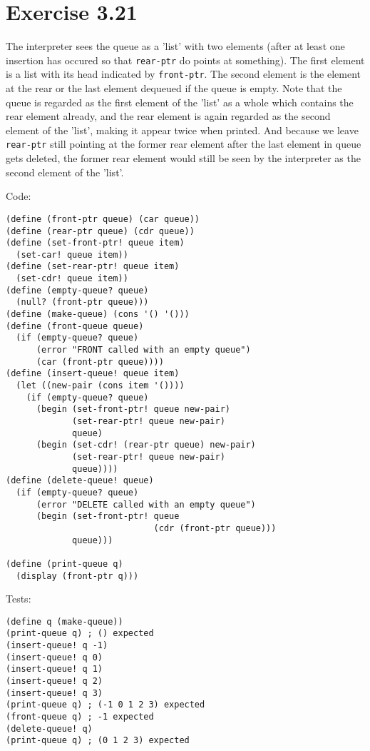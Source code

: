 \documentclass[../main.tex]{subfiles}
\begin{document}
\section{Exercise 3.21}

The interpreter sees the queue as a 'list'
 with two elements (after at least one insertion
 has occured so that \lstinline{rear-ptr} do
 points at something). The first element is a
 list with its head indicated by
 \lstinline{front-ptr}. The second element
 is the element at the rear or the last element
 dequeued if the queue is empty.
 Note that the queue is regarded as the first element
 of the 'list' as a whole which contains the rear
 element already, and the rear element is again
 regarded as the second element of the 'list',
 making it appear twice when printed. And because
 we leave \lstinline{rear-ptr} still
 pointing at the former rear element after the
 last element in queue gets deleted, the former
 rear element would still be seen by the
 interpreter as the second element of the 'list'.

Code:

\begin{lstlisting}
(define (front-ptr queue) (car queue))
(define (rear-ptr queue) (cdr queue))
(define (set-front-ptr! queue item)
  (set-car! queue item))
(define (set-rear-ptr! queue item)
  (set-cdr! queue item))
(define (empty-queue? queue)
  (null? (front-ptr queue)))
(define (make-queue) (cons '() '()))
(define (front-queue queue)
  (if (empty-queue? queue)
      (error "FRONT called with an empty queue")
      (car (front-ptr queue))))
(define (insert-queue! queue item)
  (let ((new-pair (cons item '())))
    (if (empty-queue? queue)
      (begin (set-front-ptr! queue new-pair)
             (set-rear-ptr! queue new-pair)
             queue)
      (begin (set-cdr! (rear-ptr queue) new-pair)
             (set-rear-ptr! queue new-pair)
             queue))))
(define (delete-queue! queue)
  (if (empty-queue? queue)
      (error "DELETE called with an empty queue")
      (begin (set-front-ptr! queue
                             (cdr (front-ptr queue)))
             queue)))

(define (print-queue q)
  (display (front-ptr q)))
\end{lstlisting}

Tests:

\begin{lstlisting}
(define q (make-queue))
(print-queue q) ; () expected
(insert-queue! q -1)
(insert-queue! q 0)
(insert-queue! q 1)
(insert-queue! q 2)
(insert-queue! q 3)
(print-queue q) ; (-1 0 1 2 3) expected
(front-queue q) ; -1 expected
(delete-queue! q)
(print-queue q) ; (0 1 2 3) expected
\end{lstlisting}
\end{document}
